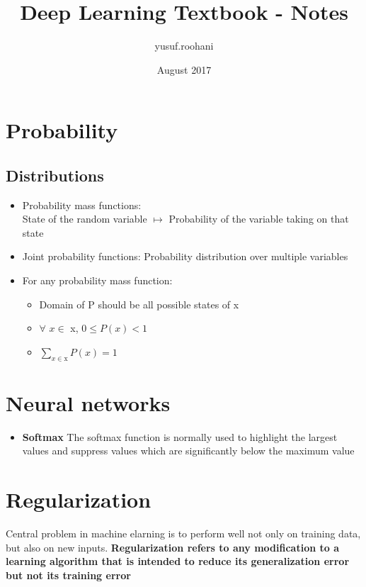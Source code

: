 \documentclass{article}
\title{Deep Learning Textbook - Notes}
\author{yusuf.roohani }
\date{August 2017}
\begin{document}
\maketitle
\section{Probability}

\subsection{Distributions}

\begin{itemize}
    \item Probability mass functions:\\
    State of the random variable $\mapsto$ Probability of the variable taking on that state
    
    \item Joint probability functions:
    Probability distribution over multiple variables
    
    \item 
    For any probability mass function:
    \begin{itemize}
    \item Domain of P should be all possible states of x
    \item $\forall$ $x \in$ x, $ 0 \leq P(x) < 1$
    \item $\sum_{x \in \textrm{x}} P(x) = 1$
    \end{itemize}
\end{itemize}

\section{Neural networks}

\begin{itemize}
    \item \textbf{Softmax} The softmax function is normally used to highlight the largest values and suppress values which are significantly below the maximum value
\end{itemize}

\section{Regularization}
Central problem in machine elarning is to perform well not only on training data, but also on new inputs. \textbf{Regularization refers to any modification to a learning algorithm that is intended to reduce its generalization error but not its training error}
\end{document}
